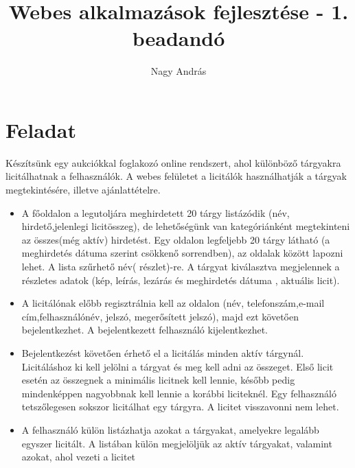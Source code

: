 \documentclass[12pt,a4paper]{article}
\author{Nagy András}
\title{Webes alkalmazások fejlesztése - 1. beadandó}
\begin{document}
\maketitle

\section{Feladat}
Készítsünk egy aukciókkal foglakozó online rendszert, ahol különböző tárgyakra
licitálhatnak a felhasználók.
A  webes  felületet  a  licitálók  használhatják  a 
tárgyak  megtekintésére,  illetve 
ajánlattételre.
\begin{itemize}
\item A  főoldalon  a  legutoljára  meghirdetett  20 tárgy listázódik (név,  hirdető,jelenlegi licitösszeg), de lehetőségünk van kategóriánként megtekinteni az összes(még  aktív)  hirdetést. Egy  oldalon  legfeljebb  20  tárgy  látható  (a 
meghirdetés dátuma szerint csökkenő sorrendben), 
az oldalak között lapozni lehet. A lista szűrhető név(
részlet)-re. A tárgyat kiválasztva megjelennek a 
részletes adatok (kép, leírás, lezárás és meghirdetés 
dátuma , aktuális licit).
\item A licitálónak előbb regisztrálnia kell az oldalon (név, telefonszám,e-mail cím,felhasználónév, jelszó, megerősített jelszó), majd ezt követően bejelentkezhet. A bejelentkezett felhasználó kijelentkezhet.
\item Bejelentkezést  követően érhető  el  a  licitálás  minden  aktív  tárgynál. Licitáláshoz ki 
kell jelölni a tárgyat és meg kell adni az összeget. Első licit esetén az  összegnek a  minimális  licitnek  kell  lennie, később  pedig mindenképpen nagyobbnak kell lennie a korábbi liciteknél. Egy felhasználó tetszőlegesen sokszor licitálhat egy tárgyra. A licitet visszavonni nem lehet.
\item A felhasználó külön listázhatja azokat a tárgyakat, amelyekre legalább egyszer 
licitált. A listában külön megjelöljük az aktív tárgyakat, valamint azokat, ahol 
vezeti a licitet
\end{itemize}
\end{document}

